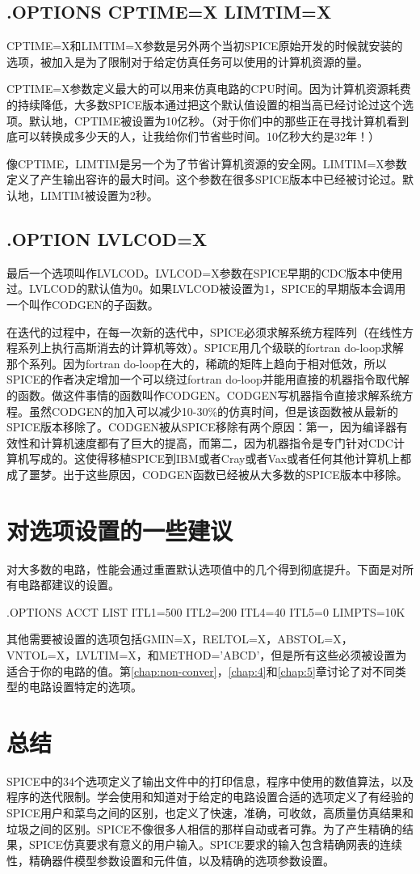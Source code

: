 \subsection{.OPTIONS CPTIME=X LIMTIM=X}
CPTIME=X和LIMTIM=X参数是另外两个当初SPICE原始开发的时候就安装的选项，被加入是为了限制对于给定仿真任务可以使用的计算机资源的量。

CPTIME=X参数定义最大的可以用来仿真电路的CPU时间。因为计算机资源耗费的持续降低，大多数SPICE版本通过把这个默认值设置的相当高已经讨论过这个选项。默认地，CPTIME被设置为10亿秒。（对于你们中的那些正在寻找计算机看到底可以转换成多少天的人，让我给你们节省些时间。10亿秒大约是32年！）

像CPTIME，LIMTIM是另一个为了节省计算机资源的安全网。LIMTIM=X参数定义了产生输出容许的最大时间。这个参数在很多SPICE版本中已经被讨论过。默认地，LIMTIM被设置为2秒。

\subsection{.OPTION LVLCOD=X}
最后一个选项叫作LVLCOD。LVLCOD=X参数在SPICE早期的CDC版本中使用过。LVLCOD的默认值为0。如果LVLCOD被设置为1，SPICE的早期版本会调用一个叫作CODGEN的子函数。

在迭代的过程中，在每一次新的迭代中，SPICE必须求解系统方程阵列（在线性方程系列上执行高斯消去的计算机等效）。SPICE用几个级联的fortran do-loop求解那个系列。因为fortran do-loop在大的，稀疏的矩阵上趋向于相对低效，所以SPICE的作者决定增加一个可以绕过fortran do-loop并能用直接的机器指令取代解的函数。做这件事情的函数叫作CODGEN。CODGEN写机器指令直接求解系统方程。虽然CODGEN的加入可以减少10-30\%的仿真时间，但是该函数被从最新的SPICE版本移除了。CODGEN被从SPICE移除有两个原因：第一，因为编译器有效性和计算机速度都有了巨大的提高，而第二，因为机器指令是专门针对CDC计算机写成的。这使得移植SPICE到IBM或者Cray或者Vax或者任何其他计算机上都成了噩梦。出于这些原因，CODGEN函数已经被从大多数的SPICE版本中移除。

\section{对选项设置的一些建议}
对大多数的电路，性能会通过重置默认选项值中的几个得到彻底提升。下面是对所有电路都建议的设置。

.OPTIONS ACCT LIST ITL1=500 ITL2=200 ITL4=40 ITL5=0 LIMPTS=10K

其他需要被设置的选项包括GMIN=X，RELTOL=X，ABSTOL=X，VNTOL=X，LVLTIM=X，和METHOD='ABCD'，但是所有这些必须被设置为适合于你的电路的值。第\ref{chap:non-conver}，\ref{chap:4}和\ref{chap:5}章讨论了对不同类型的电路设置特定的选项。

\section{总结}
SPICE中的34个选项定义了输出文件中的打印信息，程序中使用的数值算法，以及程序的迭代限制。学会使用和知道对于给定的电路设置合适的选项定义了有经验的SPICE用户和菜鸟之间的区别，也定义了快速，准确，可收敛，高质量仿真结果和垃圾之间的区别。SPICE不像很多人相信的那样自动或者可靠。为了产生精确的结果，SPICE仿真要求有意义的用户输入。SPICE要求的输入包含精确网表的连续性，精确器件模型参数设置和元件值，以及精确的选项参数设置。



